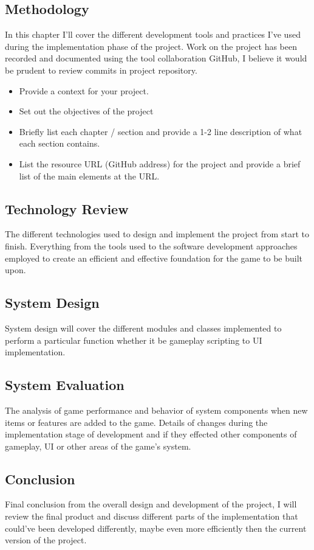 \subsection{Methodology}
In this chapter I'll cover the different development tools and practices I've used during the implementation phase of the project. Work on the project has been recorded and documented using the tool collaboration GitHub, I believe it would be prudent to review commits in project repository.
\begin{itemize}
	\item Provide a context for your project.
	\item Set out the objectives of the project
	\item Briefly list each chapter / section and provide a 1-2 line description of what each section contains.
	\item List the resource URL (GitHub address) for the project and provide a brief list of the main elements at the URL.
\end{itemize}

\subsection{Technology Review}
The different technologies used to design and implement the project from start to finish. Everything from the tools used to the software development approaches employed to create an efficient and effective foundation for the game to be built upon.
\subsection{System Design}
System design will cover the different modules and classes implemented to perform a particular function whether it be gameplay scripting to UI implementation.
\subsection{System Evaluation}
The analysis of game performance and behavior of system components when new items or features are added to the game. Details of changes during the implementation stage of development and if they effected other components of gameplay, UI or other areas of the game's system.
\subsection{Conclusion}
Final conclusion from the overall design and development of the project, I will review the final product and discuss different parts of the implementation that could've been developed differently, maybe even more efficiently then the current version of the project.

